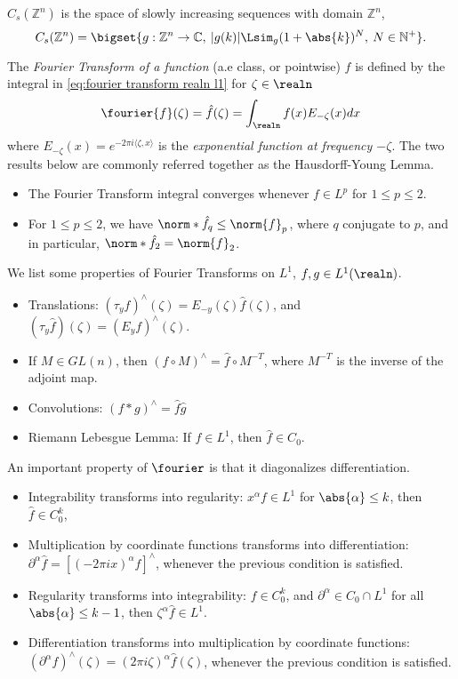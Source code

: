\documentclass[../main-v2-manifolds.tex]{subfiles}
\begin{document}
\begin{definition}
    $C_s(\mathbb{Z}^n)$ is the space of slowly increasing sequences with domain $\mathbb{Z}^n$,
    \[
    C_s(\mathbb{Z}^n) = \bigset{g: \mathbb{Z}^n\to\mathbb{C},\: \vert g(k)\vert\Lsim_{g}(1+\abs{k})^{N},\:N\in\mathbb{N}^+}.
    \]
\end{definition}
The \emph{Fourier Transform of a function} (a.e class, or pointwise) $f$ is defined by the integral in \cref{eq:fourier transform realn l1} for $\zeta\in\realn$
\begin{equation}
    \fourier{f}(\zeta)= \hat{f}(\zeta) = \int_{\realn} f(x)E_{-\zeta}(x)dx
    \label{eq:fourier transform realn l1}
\end{equation}
where $E_{-\zeta}(x) = e^{-2\pi i \langle \zeta, x\rangle}$ is the \emph{exponential function at frequency $-\zeta$}. The two results below are commonly referred together as the Hausdorff-Young Lemma.
\begin{itemize}
    \item The Fourier Transform integral converges whenever $f\in L^p$ for $1\leq p \leq 2$. 
    \item For $1\leq p\leq 2$, we have $\norm*{\hat{f}}_{q}\leq \norm{f}_p$, where $q$ conjugate to $p$, and in particular, $\norm*{\hat{f}}_2 = \norm{f}_{2}$.
\end{itemize}
We list some properties of Fourier Transforms on $L^1$, $f,g\in L^1(\realn)$.
\begin{itemize}
    \item Translations: $(\tau_y f)^\wedge(\zeta) = E_{-y}(\zeta)\hat{f}(\zeta)$, and $(\tau_{y}\hat{f})(\zeta) = (E_{y}f)^{\wedge}(\zeta)$.
    \item If $M\in GL(n)$, then $(f\circ M)^{\wedge} = \hat{f}\circ M^{-T}$, where $M^{-T}$ is the inverse of the adjoint map.
    \item Convolutions: $(f\ast g)^{\wedge} = \hat{f}\hat{g}$
    \item Riemann Lebesgue Lemma: If $f\in L^1$, then $\hat{f}\in C_0$.
\end{itemize}
An important property of $\fourier$ is that it diagonalizes differentiation.
\begin{itemize}
    \item Integrability transforms into regularity: $x^{\alpha}f\in L^1$ for $\abs{\alpha}\leq k$, then $\hat{f}\in C_0^k$,
    \item Multiplication by coordinate functions transforms into differentiation: $\partial^\alpha\hat{f} = [(-2\pi i x)^{\alpha}f]^{\wedge}$, whenever the previous condition is satisfied.
    \item Regularity transforms into integrability: $f\in C_0^k$, and $\partial^\alpha\in C_0\cap L^1$ for all $\abs{\alpha}\leq k-1$, then $\zeta^\alpha\hat{f}\in L^1$.
    \item Differentiation transforms into multiplication by coordinate functions: $(\partial^\alpha f)^\wedge(\zeta) = (2\pi i \zeta)^{\alpha}\hat{f}(\zeta)$, whenever the previous condition is satisfied.
\end{itemize}
\end{document}
